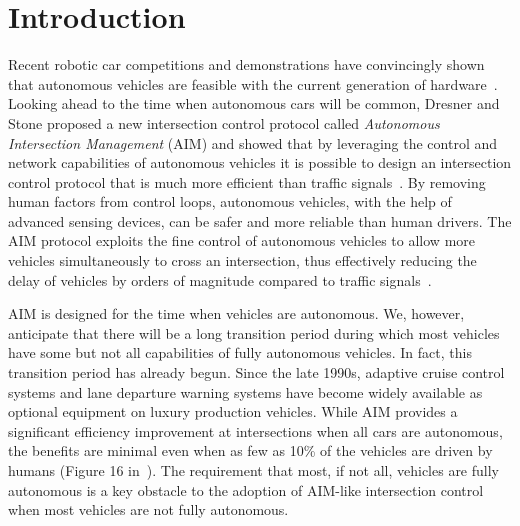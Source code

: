 \section{Introduction}
\label{sec:introduction}

Recent robotic car competitions and demonstrations have convincingly
shown that autonomous vehicles are feasible with the current
generation of hardware~\cite{mybib:Darpa07Urban}. Looking ahead to the
time when autonomous cars will be common, Dresner and Stone proposed a
new intersection control protocol called \emph{Autonomous Intersection
Management} (AIM) and showed that by leveraging the control and
network capabilities of autonomous vehicles it is possible to design
an intersection control protocol that is much more efficient than
traffic signals~\cite{bib:Dresner08Multiagent}.  By removing human
factors from control loops, autonomous vehicles, with the help of
advanced sensing devices, can be safer and more reliable than human
drivers.  The AIM protocol exploits the fine control of autonomous
vehicles to allow more vehicles simultaneously to cross an
intersection, thus effectively reducing the delay of vehicles by
orders of magnitude compared to traffic
signals~\cite{bib:Fajardo12Automated}.

AIM is designed for the time when vehicles are autonomous.  We,
however, anticipate that there will be a long transition period during
which most vehicles have some but not all capabilities of fully
autonomous vehicles.  In fact, this transition period has already
begun. Since the late 1990s, adaptive cruise control systems and lane
departure warning systems have become widely available as optional
equipment on luxury production vehicles. While
AIM provides a significant efficiency improvement at intersections
when all cars are autonomous, the benefits are minimal even when as
few as 10\% of the vehicles are driven by humans (Figure 16
in~\cite{bib:Dresner08Multiagent}).  The requirement that most,
if not all,
vehicles are fully autonomous is a key obstacle to the adoption
of AIM-like intersection control when most vehicles are not fully autonomous.


